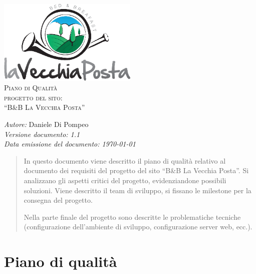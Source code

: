 \documentclass[a4paper,12pt,hidelinks]{report}
\begin{document}
  \begin{titlepage}
    \begin{center}
      \includegraphics[width=0.5\textwidth,keepaspectratio=true]{../img/logo}\\[1cm]    
      \textsc{\LARGE Piano di Qualità}\\[0.6cm]
      \textsc{\LARGE  progetto del sito:\\[0.5cm] ``B\&B La Vecchia Posta''}\\ [2.0cm]

      \begin{minipage}{0.8\textwidth}
	\begin{flushleft} \large
	  \emph{Autore:} Daniele Di Pompeo \\[0.5cm]
	  \emph{Versione documento: 1.1}\\[0.5cm]
	  \emph{Data emissione del documento: \today}\\[0.5cm]
	\end{flushleft}
      \end{minipage}
    \end{center}
  \end{titlepage}

\tableofcontents
 
\begin{abstract}
In questo documento viene descritto il piano di qualità relativo al documento dei requisiti del progetto del sito ``B\&B La Vecchia Posta''. Si analizzano gli aspetti 
critici del progetto, evidenziandone possibili soluzioni. Viene descritto il team di sviluppo, si fissano le milestone per la consegna del progetto.
\par Nella parte finale del progetto sono descritte le problematiche tecniche (configurazione dell'ambiente di sviluppo, configurazione server web, ecc.).
\end{abstract}

\chapter{Piano di qualità}
\end{document}
